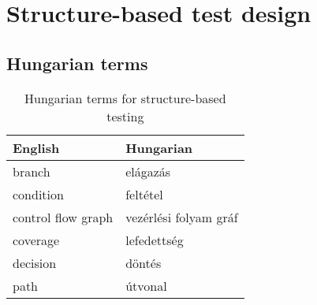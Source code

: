 \chapter{Structure-based test design}



\section{Hungarian terms}

\begin{table}[ht]
    \centering
    \small
    \caption{Hungarian terms for structure-based testing}
    \begin{tabular}{ll}
        \toprule
        \textbf{English} & \textbf{Hungarian} \\
        \midrule
        branch & elágazás \\
        condition & feltétel \\
        control flow graph & vezérlési folyam gráf \\
        coverage & lefedettség \\        
        decision & döntés \\
        path & útvonal \\
        \bottomrule
        \end{tabular}
        \label{tab:overview:hungarian-terms-testing-structure}
        \end{table} 